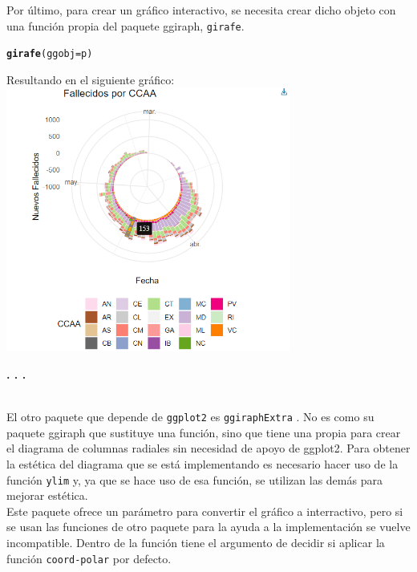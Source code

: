\documentclass{article}\usepackage[]{graphicx}\usepackage[]{color}
\makeatletter
\newcommand{\hlstd}[1]{\textcolor[rgb]{0.345,0.345,0.345}{#1}}%
\newcommand{\hlkwc}[1]{\textcolor[rgb]{0.333,0.667,0.333}{#1}}%
\newcommand{\hlkwd}[1]{\textcolor[rgb]{0.737,0.353,0.396}{\textbf{#1}}}%
\newenvironment{kframe}{%
 \def\at@end@of@kframe{}%
 \ifinner\ifhmode%
  \def\at@end@of@kframe{\end{minipage}}%
  \begin{minipage}{\columnwidth}%
 \fi\fi%
 \def\FrameCommand##1{\hskip\@totalleftmargin \hskip-\fboxsep
 \colorbox{shadecolor}{##1}\hskip-\fboxsep
     \hskip-\linewidth \hskip-\@totalleftmargin \hskip\columnwidth}%
 \MakeFramed {\advance\hsize-\width
   \@totalleftmargin\z@ \linewidth\hsize
   \@setminipage}}%
 {\par\unskip\endMakeFramed%
 \at@end@of@kframe}
\newenvironment{knitrout}{}{} %
\makeatother
\begin{document}
Por \'ultimo, para crear un gr\'afico interactivo, se necesita crear dicho objeto con una funci\'on propia del paquete ggiraph, \texttt{girafe}.
\begin{knitrout}
\color{fgcolor}\begin{kframe}
\begin{alltt}
\hlkwd{girafe}\hlstd{(}\hlkwc{ggobj} \hlstd{= p)}
\end{alltt}
\end{kframe}
\end{knitrout}
\clearpage
Resultando en el siguiente gr\'afico:~\\
\vbox{
    \centering
    \includegraphics[width=0.7\textwidth]{imag/ggiraph_inte}
}
\begin{center}
\textbf{. . .}
\end{center}~\\
El otro paquete que depende de \texttt{ggplot2} es \texttt{ggiraphExtra} %
. No es como su paquete ggiraph que sustituye una funci\'on, sino que tiene una propia para crear el diagrama de columnas radiales sin necesidad de apoyo de ggplot2. Para obtener la est\'etica del diagrama que se est\'a implementando es necesario hacer uso de la funci\'on \texttt{ylim} y, ya que se hace uso de esa funci\'on, se utilizan las dem\'as para mejorar est\'etica.~\\
Este paquete ofrece un par\'ametro para convertir el gr\'afico a interractivo, pero si se usan las funciones de otro paquete para la ayuda a la implementaci\'on se vuelve incompatible.
Dentro de la funci\'on tiene el argumento de decidir si aplicar la funci\'on \texttt{coord-polar} por defecto.
\end{document}
